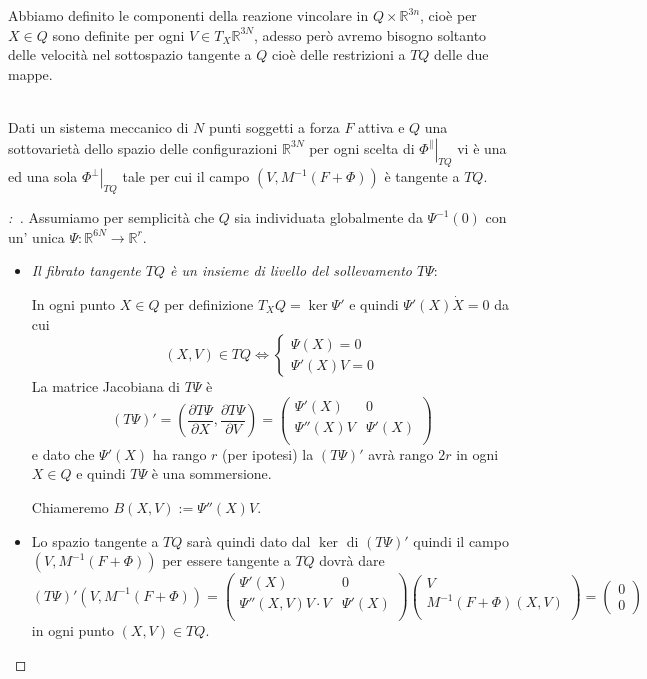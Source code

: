 \documentclass[11pt,a4paper,twoside]{book}
\newenvironment{proposizione}[1][\empty]{\begin{Proposizione}{
\ifx\empty#1\relax\else\mdseries\itshape#1\\\fi
}{}}{\end{Proposizione}}
\newenvironment{dimo}[1][\proofname]{
	\begin{tcolorbox}[
	breakable, 
	enhanced, 
	interior hidden, 
	frame hidden, 
	borderline west = {1pt}{0pt}{gray}, 
	top=0pt, bottom=0pt, left=0pt]
\begin{proof}[#1:~]
}
{
\end{proof}
\end{tcolorbox}
}
\theoremstyle{esss}
\theoremstyle{dotless}
\numberwithin{equation}{section} %
\begin{document}
Abbiamo definito le componenti della reazione vincolare in $Q\times\mathbb{R}^{3n}$, cioè per $X\in Q$ sono definite per ogni $V\in T_X\mathbb{R}^{3N}$, adesso però avremo bisogno soltanto delle velocità nel sottospazio tangente a $Q$ cioè delle restrizioni a $TQ$ delle due mappe.

\begin{proposizione}\label{propUnicaReazione}
Dati un sistema meccanico di $N$ punti soggetti a forza $F$ attiva e $Q$ una sottovarietà dello spazio delle configurazioni $\mathbb{R}^{3N}$ per ogni scelta di $\left. \Phi^\parallel \right|_{TQ}$ vi è una ed una sola $\left. \Phi^\perp \right|_{TQ}$ tale per cui il campo $\left( V, M^{-1} (F+\Phi) \right)$ è tangente a $TQ$.
\end{proposizione}
\begin{dimo}
Assumiamo per semplicità che $Q$ sia individuata globalmente da $\Psi^{-1}(0)$ con un' unica $\Psi:\mathbb{R}^{6N}\rightarrow\mathbb{R}^r$.
\begin{itemize}
\item \emph{Il fibrato tangente $TQ$ è un insieme di livello del sollevamento $T\Psi$}:

In ogni punto $X\in Q$ per definizione $T_XQ=\ker{\Psi'}$ e quindi $\Psi'(X)\dot{X}=0$ da cui
\begin{equation} (X,V)\in TQ \iff \begin{cases} \Psi(X)=0 \\ \Psi'(X)V=0\end{cases} \end{equation}
La matrice Jacobiana di $T\Psi$ è 
\[
(T\Psi)'=\left(\dfrac{\partial T\Psi}{\partial X}, \dfrac{\partial T\Psi}{\partial V}\right)=\left(
\begin{array}{cc}
\Psi'(X) & 0 \\
\Psi''(X)V & \Psi'(X) \\
\end{array}\right)
\]
e dato che $\Psi'(X)$ ha rango $r$ (per ipotesi) la $(T\Psi)'$ avrà rango $2r$ in ogni $X\in Q$ e quindi $T\Psi$ è una sommersione.

Chiameremo $B(X,V):=\Psi''(X)V$.

\item Lo spazio tangente a $TQ$ sarà quindi dato dal $\ker$ di $(T\Psi)'$ quindi il campo $(V,M^{-1}(F+\Phi))$ per essere tangente a $TQ$ dovrà dare
\[
(T\Psi)' \left(V,M^{-1}(F+\Phi)\right)=\left(
\begin{array}{cc}
\Psi'{\scriptstyle(X)} & 0 \\
\Psi''{\scriptstyle (X,V)} V\cdot V & \Psi'{\scriptstyle(X)} \\
\end{array}\right) \left( \begin{array}{c}
V \\
M^{-1}(F+\Phi){\scriptstyle(X,V)} \\
\end{array}\right)=\left(\begin{array}{c}
0 \\ 0 
\end{array}\right)
\]
in ogni punto $(X,V)\in TQ$.


\end{itemize}
\end{dimo}
\end{document}
